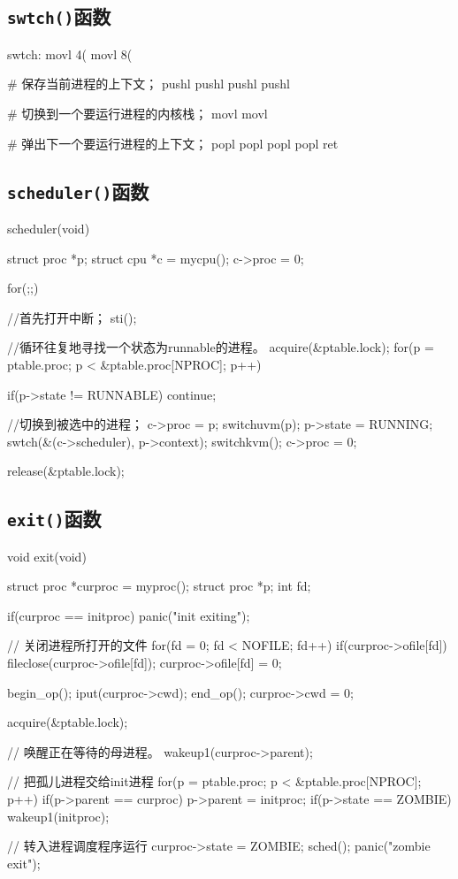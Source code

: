 \documentclass{swfuthesism}
\begin{document}
\subsection{\texttt{swtch()}函数}
\label{sec:swtch}

\begin{gascode}
swtch:
  movl 4(%
  movl 8(%
 
  # 保存当前进程的上下文；
  pushl %
  pushl %
  pushl %
  pushl %
 
  # 切换到一个要运行进程的内核栈；
  movl %
  movl %
 
  # 弹出下一个要运行进程的上下文；
  popl %
  popl %
  popl %
  popl %
  ret
\end{gascode}

\subsection{\texttt{scheduler()}函数}
\label{sec:scheduler}

\begin{ccode}
scheduler(void)
{
  struct proc *p;
  struct cpu *c = mycpu();
  c->proc = 0;
  
  for(;;){
    //首先打开中断；
    sti();

    //循环往复地寻找一个状态为runnable的进程。
    acquire(&ptable.lock);
    for(p = ptable.proc; p < &ptable.proc[NPROC]; p++){
      if(p->state != RUNNABLE)
        continue;

      //切换到被选中的进程；
      c->proc = p;
      switchuvm(p);
      p->state = RUNNING;
      swtch(&(c->scheduler), p->context);
      switchkvm();
      c->proc = 0;
    }
    release(&ptable.lock);
  }
}
\end{ccode}


\subsection{\texttt{exit()}函数}
\label{sec:exit}

\begin{ccode}
void exit(void)
{
  struct proc *curproc = myproc();
  struct proc *p;
  int fd;

  if(curproc == initproc)
    panic("init exiting");

  // 关闭进程所打开的文件
  for(fd = 0; fd < NOFILE; fd++){
    if(curproc->ofile[fd]){
      fileclose(curproc->ofile[fd]);
      curproc->ofile[fd] = 0;
    }
  }

  begin_op();
  iput(curproc->cwd);
  end_op();
  curproc->cwd = 0;

  acquire(&ptable.lock);

  // 唤醒正在等待的母进程。
  wakeup1(curproc->parent);

  // 把孤儿进程交给init进程
  for(p = ptable.proc; p < &ptable.proc[NPROC]; p++){
    if(p->parent == curproc){
      p->parent = initproc;
      if(p->state == ZOMBIE)
        wakeup1(initproc);
    }
  }

  // 转入进程调度程序运行
  curproc->state = ZOMBIE;
  sched();
  panic("zombie exit");
}
\end{ccode}
\end{document}
